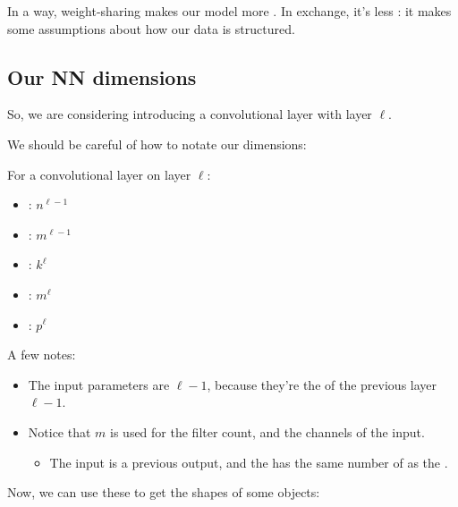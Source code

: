         In a way, weight-sharing makes our model more . In exchange, it's less : it makes some assumptions about how our data is structured.

    \pagebreak

    \subsection{Our NN dimensions}

        So, we are considering introducing a convolutional layer with layer $\ell$.

        We should be careful of how to notate our dimensions:\\

        \begin{notation}
            For a convolutional layer on layer $\ell$:

            \begin{itemize}
                \item {}: $n^{\ell-1}$
                \item {}: $m^{\ell-1}$
                \item {}: $k^\ell$
                \item {}: $m^\ell$
                \item {}: $p^\ell$
            \end{itemize}
        \end{notation}

        A few notes:

        \begin{itemize}
            \item The input parameters are $\ell-1$, because they're the  of the previous layer $\ell-1$.
            \item Notice that $m$ is used for the filter count, and the channels of the input.
                \begin{itemize}
                    \item The input is a previous output, and the  has the same number of  as the .
                \end{itemize}
        \end{itemize}

        Now, we can use these to get the shapes of some objects:\\

